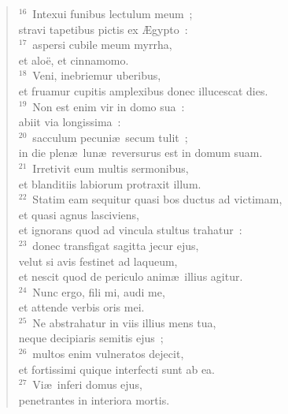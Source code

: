 \begin{flushleft}
\begin{verse}
${}^{16}$~Intexui funibus lectulum meum~;\\ stravi tapetibus pictis ex \AE gypto~:\\
${}^{17}$~aspersi cubile meum myrrha,\\ et alo\"e, et cinnamomo.\\
${}^{18}$~Veni, inebriemur uberibus,\\ et fruamur cupitis amplexibus donec illucescat dies.\\
${}^{19}$~Non est enim vir in domo sua~:\\ abiit via longissima~:\\
${}^{20}$~sacculum pecuni\ae\ secum tulit~;\\ in die plen\ae\ lun\ae\ reversurus est in domum suam.\\
${}^{21}$~Irretivit eum multis sermonibus,\\ et blanditiis labiorum protraxit illum.\\
${}^{22}$~Statim eam sequitur quasi bos ductus ad victimam,\\ et quasi agnus lasciviens,\\ et ignorans quod ad vincula stultus trahatur~:\\
${}^{23}$~donec transfigat sagitta jecur ejus,\\ velut si avis festinet ad laqueum,\\ et nescit quod de periculo anim\ae\ illius agitur.\\
${}^{24}$~Nunc ergo, fili mi, audi me,\\ et attende verbis oris mei.\\
${}^{25}$~Ne abstrahatur in viis illius mens tua,\\ neque decipiaris semitis ejus~;\\
${}^{26}$~multos enim vulneratos dejecit,\\ et fortissimi quique interfecti sunt ab ea.\\
${}^{27}$~Vi\ae\ inferi domus ejus,\\ penetrantes in interiora mortis.\end{verse}\end{flushleft}


